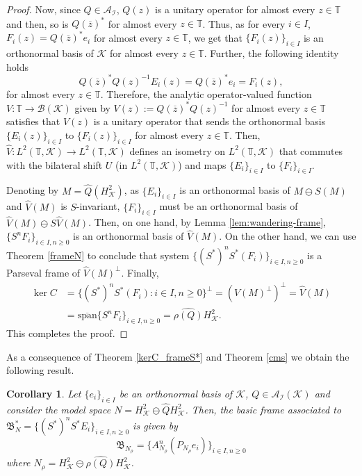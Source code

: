 \documentclass[a4paper,12pt]{amsart}
\def\cA{{\mathcal{A}}}
\def\cB{{\mathcal{B}}}
\def\cI{{\mathcal{I}}}
\def\KK{{\mathcal{K}}}
\def\T{{\mathbb{T}}}
\newtheorem{corollary}[theorem]{Corollary}
\theoremstyle{definition}
\begin{document}
\begin{proof}
Now, since $Q\in\cA_\cI$, $Q(z)$ is a unitary operator for almost every $z\in\T$ and then, so is $Q(\overline{z})^*$ for almost every $z\in\T$. Thus, as for every $i\in I$, $F_i(z)=Q(\overline{z})^*e_i$ for almost every $z\in\T$, we get that $\{F_i(z)\}_{i\in I}$ is an orthonormal basis of $\KK$ for almost every $z\in\T$.
Further, the following identity holds 
\begin{equation*}
Q(\overline{z})^*Q(z)^{-1} E_i(z)=Q(\overline{z})^*e_i=F_i(z),
\end{equation*}
for almost every $z\in\T$. Therefore, the analytic operator-valued function $V:\T\to\cB(\KK)$ given by $V(z):=Q(\overline{z})^*Q(z)^{-1}$ for almost every $z\in\T$ satisfies that $V(z)$ is a unitary operator that sends the orthonormal basis $\{E_i(z)\}_{i\in I}$ to $\{F_i(z)\}_{i\in I}$ for almost every $z\in\T$.
Then, $\widehat{V}:L^2 (\T,\KK)\to L^2 (\T,\KK)$ defines an isometry on $L^2 (\T,\KK)$ that commutes with the bilateral shift $U$ (in $L^2 (\T,\KK)$) and maps $\{E_i\}_{i\in I}$ to $\{F_i\}_{i\in I}$. 

Denoting by $M=\widehat{Q}(H^2_\KK)$, as $\{E_i\}_{i\in I}$ is an orthonormal basis of $M\ominus S(M)$ and $\widehat{V}(M)$ is $S$-invariant, $\{F_i\}_{i\in I}$ must be an orthonormal basis of $\widehat{V}(M)\ominus S\widehat{V}(M)$. Then, on one hand, by Lemma \ref{lem:wandering-frame}, $\{S^nF_i\}_{i\in I,n\geqslant0}$ is an orthonormal basis of $\widehat{V}(M)$. On the other hand, we can use Theorem \ref{frameN} to conclude that system $\{(S^*)^nS^*(F_i)\}_{i\in I,n\geqslant0}$ is a Parseval frame of $\widehat{V}(M)^{\perp}$. 
Finally, 
\begin{align*}
\ker C&=\{(S^*)^nS^*(F_i):i\in I,n\geqslant0\}^\perp=(\widehat{V}(M)^{\perp})^\perp=\widehat{V}(M)
\\
&=\overline{\text{span}}\{S^nF_i\}_{i\in I,n\geqslant0}=\widehat{\rho(Q)} H^2_\KK.
\end{align*}
This completes the proof.
\end{proof}



As a consequence of Theorem \ref{kerC_frameS*} and Theorem \ref{cms} we obtain the following result.

\begin{corollary}\label{basic_tuple_S*}
Let $\{e_i\}_{i\in I}$ be an orthonormal basis of $\KK$, $Q\in\cA_\cI(\KK)$ and consider the model space $N = H^2_\KK\ominus\widehat{Q}H^2_\KK$. Then, the basic frame associated to $\mathfrak{B}_N^*=\{(S^*)^n S^*E_i\}_{i\in I,n\geqslant0}$
 is given by
$$\mathfrak{B}_{N_\rho}=\{A_{N_\rho}^n(P_{N_\rho}e_i)\}_{i\in I,n\geqslant0}$$
where $N_\rho= H^2_\KK\ominus\widehat{\rho(Q)}H^2_\KK$.
\end{corollary}
\end{document}
